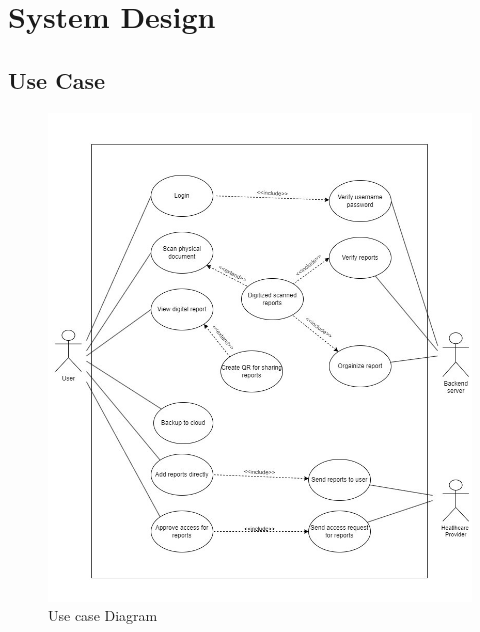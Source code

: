 \chapter{System Design}\label{ch:timeschedule}
\section{Use Case}
\begin{figure}[h]
    \centering
    \includegraphics[width=150mm]{figures/Usecase.jpg}
    \caption{Use case Diagram}
\end{figure}
\newpage
